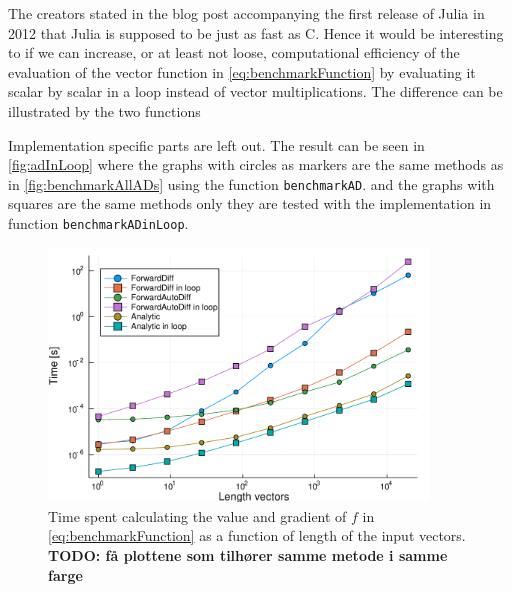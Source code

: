 The creators stated in the blog post accompanying the first release of Julia in 2012 \emph{\citep{juliaBlogRelease2012}} that Julia is supposed to be just as fast as C. Hence it would be interesting to if we can increase, or at least not loose, computational efficiency of the evaluation of the vector function in \eqref{eq:benchmarkFunction} by evaluating it scalar by scalar in a loop instead of vector multiplications. The difference can be illustrated by the two functions

Implementation specific parts are left out. The result can be seen in \autoref{fig:adInLoop} where the graphs with circles as markers are the same methods as in \autoref{fig:benchmarkAllADs} using the function \texttt{benchmarkAD}. and the graphs with squares are the same methods only they are tested with the implementation in function \texttt{benchmarkADinLoop}.
\begin{figure}[htb]
    \centering
    \includegraphics[width = 0.9\textwidth]{figures/benchmark_ad_in_loop.pdf}
    \caption{Time spent calculating the value and gradient of $f$ in \eqref{eq:benchmarkFunction} as                         a function of length of the input vectors. \textbf{TODO: få plottene som tilhører samme metode i samme farge}}
    \label{fig:adInLoop}
\end{figure}
